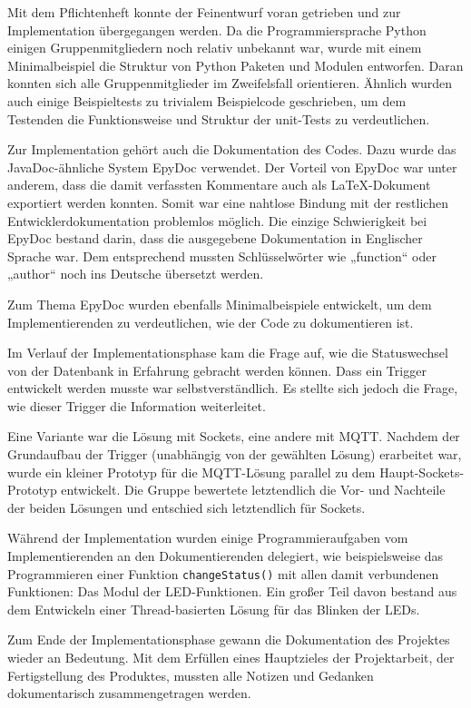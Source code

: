 Mit dem Pflichtenheft konnte der Feinentwurf voran getrieben und zur Implementation übergegangen werden. Da die Programmiersprache Python einigen Gruppenmitgliedern noch relativ unbekannt war, wurde mit einem Minimalbeispiel die Struktur von Python Paketen und Modulen entworfen. Daran konnten sich alle Gruppenmitglieder im Zweifelsfall orientieren. Ähnlich wurden auch einige Beispieltests zu trivialem Beispielcode geschrieben, um dem Testenden die Funktionsweise und Struktur der unit-Tests zu verdeutlichen.

Zur Implementation gehört auch die Dokumentation des Codes. Dazu wurde das JavaDoc-ähnliche System EpyDoc verwendet. Der Vorteil von EpyDoc war unter anderem, dass die damit verfassten Kommentare auch als LaTeX-Dokument exportiert werden konnten. Somit war eine nahtlose Bindung mit der restlichen Entwicklerdokumentation problemlos möglich. Die einzige Schwierigkeit bei EpyDoc bestand darin, dass die ausgegebene Dokumentation in Englischer Sprache war. Dem entsprechend mussten Schlüsselwörter wie „function“ oder „author“ noch ins Deutsche übersetzt werden.

Zum Thema EpyDoc wurden ebenfalls Minimalbeispiele entwickelt, um dem Implementierenden zu verdeutlichen, wie der Code zu dokumentieren ist. \bigskip

Im Verlauf der Implementationsphase kam die Frage auf, wie die Statuswechsel von der Datenbank in Erfahrung gebracht werden können. Dass ein Trigger entwickelt werden musste war selbstverständlich. Es stellte sich jedoch die Frage, wie dieser Trigger die Information weiterleitet. 

Eine Variante war die Lösung mit Sockets, eine andere mit MQTT. Nachdem der Grundaufbau der Trigger (unabhängig von der gewählten Lösung) erarbeitet war, wurde ein kleiner Prototyp für die MQTT-Lösung parallel zu dem Haupt-Sockets-Prototyp entwickelt. Die Gruppe bewertete letztendlich die Vor- und Nachteile der beiden Lösungen und entschied sich letztendlich für Sockets.

Während der Implementation wurden einige Programmieraufgaben vom Implementierenden an den Dokumentierenden delegiert, wie beispielsweise das Programmieren einer Funktion \lstinline`changeStatus()` mit allen damit verbundenen Funktionen: Das Modul der LED-Funktionen. Ein großer Teil davon bestand aus dem Entwickeln einer Thread-basierten Lösung für das Blinken der LEDs.\bigskip

Zum Ende der Implementationsphase gewann die Dokumentation des Projektes wieder an Bedeutung. Mit dem Erfüllen eines Hauptzieles der Projektarbeit, der Fertigstellung des Produktes, mussten alle Notizen und Gedanken dokumentarisch zusammengetragen werden.


